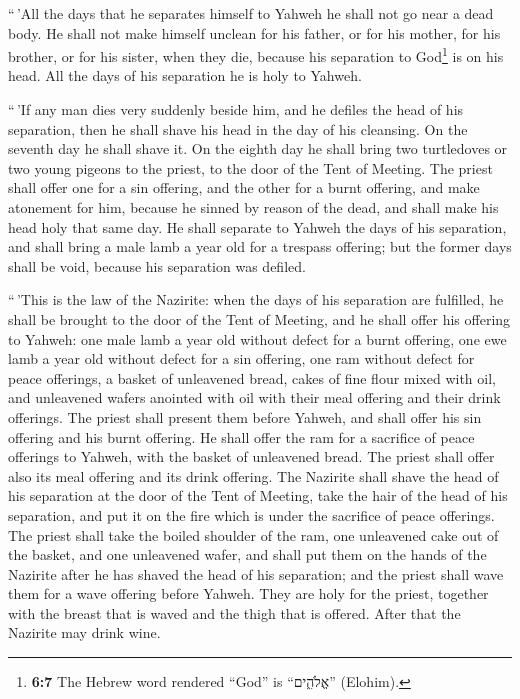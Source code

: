 ``\,'All the days that he separates himself to Yahweh he
shall not go near a dead body.  He shall not make himself
unclean for his father, or for his mother, for his brother, or for his
sister, when they die, because his separation to God\footnote{\textbf{6:7}
  The Hebrew word rendered ``God'' is ``אֱלֹהִ֑ים'' (Elohim).} is on his
head.  All the days of his separation he is holy to
Yahweh.

 ``\,'If any man dies very suddenly beside him, and he
defiles the head of his separation, then he shall shave his head in the
day of his cleansing. On the seventh day he shall shave it.
 On the eighth day he shall bring two turtledoves or two
young pigeons to the priest, to the door of the Tent of Meeting.
 The priest shall offer one for a sin offering, and the
other for a burnt offering, and make atonement for him, because he
sinned by reason of the dead, and shall make his head holy that same
day.  He shall separate to Yahweh the days of his
separation, and shall bring a male lamb a year old for a trespass
offering; but the former days shall be void, because his separation was
defiled.

 ``\,'This is the law of the Nazirite: when the days of
his separation are fulfilled, he shall be brought to the door of the
Tent of Meeting,  and he shall offer his offering to
Yahweh: one male lamb a year old without defect for a burnt offering,
one ewe lamb a year old without defect for a sin offering, one ram
without defect for peace offerings,  a basket of
unleavened bread, cakes of fine flour mixed with oil, and unleavened
wafers anointed with oil with their meal offering and their drink
offerings.  The priest shall present them before Yahweh,
and shall offer his sin offering and his burnt offering. 
He shall offer the ram for a sacrifice of peace offerings to Yahweh,
with the basket of unleavened bread. The priest shall offer also its
meal offering and its drink offering.  The Nazirite shall
shave the head of his separation at the door of the Tent of Meeting,
take the hair of the head of his separation, and put it on the fire
which is under the sacrifice of peace offerings.  The
priest shall take the boiled shoulder of the ram, one unleavened cake
out of the basket, and one unleavened wafer, and shall put them on the
hands of the Nazirite after he has shaved the head of his separation;
 and the priest shall wave them for a wave offering
before Yahweh. They are holy for the priest, together with the breast
that is waved and the thigh that is offered. After that the Nazirite may
drink wine.

